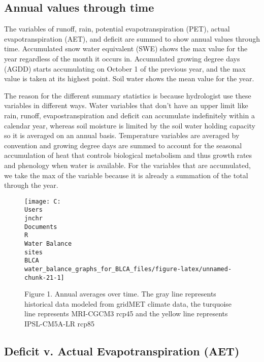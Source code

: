 \documentclass[
]{article}
\begin{document}
\hypertarget{annual-values-through-time}{%
\subsection{Annual values through
time}\label{annual-values-through-time}}

The variables of runoff, rain, potential evapotranspiration (PET),
actual evapotranspiration (AET), and deficit are summed to show annual
values through time. Accumulated snow water equivalent (SWE) shows the
max value for the year regardless of the month it occurs in. Accumulated
growing degree days (AGDD) starts accumulating on October 1 of the
previous year, and the max value is taken at its highest point. Soil
water shows the mean value for the year.

The reason for the different summary statistics is because hydrologist
use these variables in different ways. Water variables that don't have
an upper limit like rain, runoff, evapostranspiration and deficit can
accumulate indefinitely within a calendar year, whereas soil moisture is
limited by the soil water holding capacity so it is averaged on an
annual basis. Temperature variables are averaged by convention and
growing degree days are summed to account for the seasonal accumulation
of heat that controls biological metabolism and thus growth rates and
phenology when water is available. For the variables that are
accumulated, we take the max of the variable because it is already a
summation of the total through the year.

\begin{figure}

{\centering \texttt{[image: C:\\Users\\jnchr\\Documents\\R\\Water Balance\\sites\\BLCA\\water\_balance\_graphs\_for\_BLCA\_files/figure-latex/unnamed-chunk-21-1]} 

}

\caption{Figure 1. Annual averages over time. The gray line represents historical data modeled from gridMET climate data, the turquoise line represents MRI-CGCM3 rcp45 and the yellow line represents IPSL-CM5A-LR rcp85}\label{fig:unnamed-chunk-21}
\end{figure}

\hypertarget{deficit-v.-actual-evapotranspiration-aet}{%
\subsection{Deficit v. Actual Evapotranspiration
(AET)}\label{deficit-v.-actual-evapotranspiration-aet}}
\end{document}
